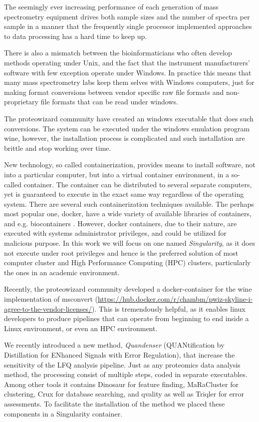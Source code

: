 \documentclass[11pt]{article}
\begin{document}
The seemingly ever increasing performance of each generation of mass spectrometry equipment drives both sample sizes and the number of spectra per sample in a manner that the frequently single processor implemented approaches to data processing has a hard time to keep up.

There is also a mismatch between the bioinformaticians who often develop methods operating under Unix, and the fact that the instrument manufacturers' software with few exception operate under Windows. In practice this means that many mass spectrometry labs keep them selves with Windows computers, just for making format conversions between vendor specific raw file formats and non-proprietary file formats that can be read under windows.

The proteowizard community have created an windows executable that does such conversions. The system can be executed under the windows emulation program wine, however, the installation process is complicated and such installation are brittle and stop working over time.

New technology, so called containerization, provides means to install software, not into a particular computer, but into a virtual container environment, in a so-called container. The container can be distributed to several separate computers, yet is guaranteed to execute in the exact same way regardless of the operating system. There are several such containerization techniques available. The perhaps most popular one, docker, have a wide variety of available libraries of containers, and e.g. biocontainers \cite{FIXME}. However, docker containers, due to their nature, are executed with systems administrator privileges, and could be utilized for malicious purpose.  In this work we will focus on one named \textit{Singularity}, as it does not execute under root privileges and hence is the preferred solution of most computer cluster and High Performance Computing (HPC) clusters, particularly the ones in an academic environment.

Recently, the proteowizard community developed a docker-container for the wine implementation of msconvert (\url{https://hub.docker.com/r/chambm/pwiz-skyline-i-agree-to-the-vendor-licenses/}). This is tremendously helpful, as it enables linux developers to produce pipelines that can operate from beginning to end inside a Linux environment, or even an HPC environment.

We recently introduced a new method, {\em Quandenser} (QUANtification by Distillation for ENhanced Signals with Error Regulation), that increase the sensitivity of the LFQ analysis pipeline. Just as any proteomics data analysis method, the processing consist of multiple steps, coded in separate executables. Among other tools it contains Dinosaur\cite{teleman2016dinosaur} for feature finding, MaRaCluster\cite{the2016maracluster} for clustering, Crux\cite{mcilwain2014} for database searching, and qvality\cite{kall2008non} as well as Triqler\cite{the2018integrated} for error assessments. To facilitate the installation of the method we placed these components in a Singularity container.
\end{document}
